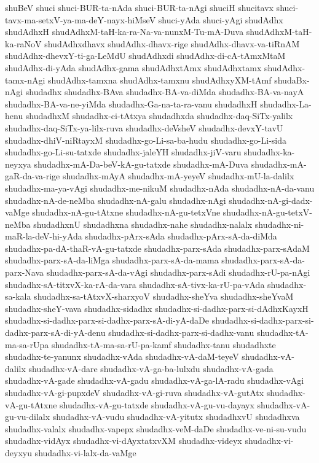 {shuBeV
shuci
shuci-BUR-ta-nAda
shuci-BUR-ta-nAgi
shuciH
shucitavx
shuci-tavx-ma-setxV-ya-ma-deY-nayx-hiMseV
shuci-yAda
shuci-yAgi
shudAdhx
shudAdhxH
shudAdhxM-taH-ka-ra-Na-va-nunxM-Tu-mA-Duva
shudAdhxM-taH-ka-raNoV
shudAdhxdhavx
shudAdhx-dhavx-rige
shudAdhx-dhavx-va-tiRnAM
shudAdhx-dhevxY-ti-ga-LeMdU
shudAdhxdi
shudAdhx-di-cA-tAmxMtaM
shudAdhx-di-yAda
shudAdhx-gama
shudAdhxtAmx
shudAdhxtamx
shudAdhx-tamx-nAgi
shudAdhx-tamxna
shudAdhx-tamxnu
shudAdhxyXM-tAmf
shudaBx-nAgi
shudadhx
shudadhx-BAva
shudadhx-BA-va-diMda
shudadhx-BA-va-nayA
shudadhx-BA-va-ne-yiMda
shudadhx-Ga-na-ta-ra-vanu
shudadhxH
shudadhx-La-henu
shudadhxM
shudadhx-ci-tAtxya
shudadhxda
shudadhx-daq-SiTx-yalilx
shudadhx-daq-SiTx-ya-lilx-ruva
shudadhx-deVsheV
shudadhx-devxY-tavU
shudadhx-dhiV-niRtayxM
shudadhx-go-Li-sa-ba-hudu
shudadhx-go-Li-sida
shudadhx-go-Li-su-tatxde
shudadhx-jaleYH
shudadhx-jiV-varu
shudadhx-ka-neyxya
shudadhx-mA-Da-beV-kA-gu-tatxde
shudadhx-mA-Duva
shudadhx-mA-gaR-da-va-rige
shudadhx-mAyA
shudadhx-mA-yeyeV
shudadhx-mU-la-dalilx
shudadhx-ma-ya-vAgi
shudadhx-me-nikuM
shudadhx-nAda
shudadhx-nA-da-vanu
shudadhx-nA-de-neMba
shudadhx-nA-galu
shudadhx-nAgi
shudadhx-nA-gi-dadx-vaMge
shudadhx-nA-gu-tAtxne
shudadhx-nA-gu-tetxVne
shudadhx-nA-gu-tetxV-neMba
shudadhxnU
shudadhxna
shudadhx-nahe
shudadhx-nalalx
shudadhx-ni-maR-la-deV-hi-yAda
shudadhx-pArx-sAda
shudadhx-pArx-sA-da-diMda
shudadhx-pa-dA-thaR-vA-gu-tatxde
shudadhx-parx-sAda
shudadhx-parx-sAdaM
shudadhx-parx-sA-da-liMga
shudadhx-parx-sA-da-mama
shudadhx-parx-sA-da-parx-Nava
shudadhx-parx-sA-da-vAgi
shudadhx-parx-sAdi
shudadhx-rU-pa-nAgi
shudadhx-sA-titxvX-ka-rA-da-vara
shudadhx-sA-tivx-ka-rU-pa-vAda
shudadhx-sa-kala
shudadhx-sa-tAtxvX-sharxyoV
shudadhx-sheYva
shudadhx-sheYvaM
shudadhx-sheY-vava
shudadhx-sidadhx
shudadhx-si-dadhx-parx-si-dAdhxKayxH
shudadhx-si-dadhx-parx-si-dadhx-parx-sA-di-yA-daDe
shudadhx-si-dadhx-parx-si-dadhx-parx-sA-di-yA-denu
shudadhx-si-dadhx-parx-si-dadhx-vanu
shudadhx-tA-ma-sa-rUpa
shudadhx-tA-ma-sa-rU-pa-kamf
shudadhx-tanu
shudadhxte
shudadhx-te-yanunx
shudadhx-vAda
shudadhx-vA-daM-teyeV
shudadhx-vA-dalilx
shudadhx-vA-dare
shudadhx-vA-ga-ba-lulxdu
shudadhx-vA-gada
shudadhx-vA-gade
shudadhx-vA-gadu
shudadhx-vA-ga-lA-radu
shudadhx-vAgi
shudadhx-vA-gi-pupxdeV
shudadhx-vA-gi-ruva
shudadhx-vA-gutAtx
shudadhx-vA-gu-tAtxne
shudadhx-vA-gu-tatxde
shudadhx-vA-gu-vu-dayayx
shudadhx-vA-gu-vu-dilalx
shudadhx-vA-vudu
shudadhx-vA-yitutx
shudadhxvU
shudadhxva
shudadhx-valalx
shudadhx-vapepx
shudadhx-veM-daDe
shudadhx-ve-ni-su-vudu
shudadhx-vidAyx
shudadhx-vi-dAyxtatxvXM
shudadhx-videyx
shudadhx-vi-deyxyu
shudadhx-vi-lalx-da-vaMge
}
